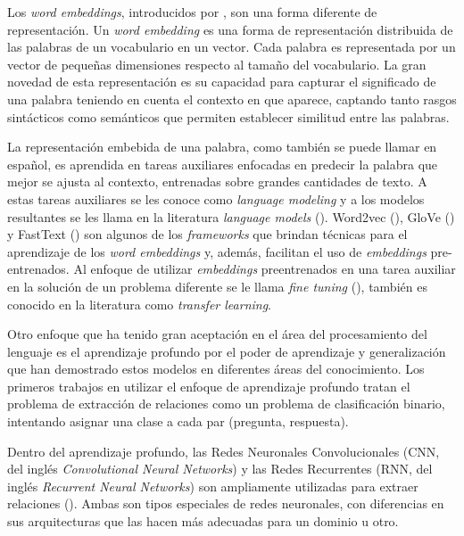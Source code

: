 Los \textit{word embeddings}, introducidos por \cite{mikolov-2013-word2vec}, son una forma diferente de representación. Un \textit{word embedding} es una forma de representación distribuida de las palabras de un vocabulario en un vector. Cada palabra es representada por un vector de pequeñas dimensiones respecto al tamaño del vocabulario. La gran novedad de esta representación es su capacidad para capturar el significado de una palabra teniendo en cuenta el contexto en que aparece, captando tanto rasgos sintácticos como semánticos que permiten establecer similitud entre las palabras.

La representación embebida de una palabra, como también se puede llamar en español, es aprendida en tareas auxiliares enfocadas en predecir la palabra que mejor se ajusta al contexto, entrenadas sobre grandes cantidades de texto. A estas tareas auxiliares se les conoce como \textit{language modeling} y a los modelos resultantes se les llama en la literatura \textit{language models} (\cite{rao-2019-nlpPython}). Word2vec (\cite{mikolov-2013-word2vec}), GloVe (\cite{pennington-2014-glove}) y FastText (\cite{mikolov-2016-fastext}) son algunos de los \textit{frameworks} que brindan técnicas para el aprendizaje de los \textit{word embeddings} y, además, facilitan el uso de \textit{embeddings} pre-entrenados. Al enfoque de utilizar \textit{embeddings} preentrenados en una tarea auxiliar en la solución de un problema diferente se le llama \textit{fine tuning} (\cite{rao-2019-nlpPython}), también es conocido en la literatura como \textit{transfer learning}.

Otro enfoque que ha tenido gran aceptación en el área del procesamiento del lenguaje es el aprendizaje profundo por el poder de aprendizaje y generalización que han demostrado estos modelos en diferentes áreas del conocimiento. Los primeros trabajos en utilizar el enfoque de aprendizaje profundo tratan el problema de extracción de relaciones como un problema de clasificación binario, intentando asignar una clase a cada par (pregunta, respuesta).

Dentro del aprendizaje profundo, las Redes Neuronales Convolucionales (CNN, del inglés \textit{Convolutional Neural Networks}) y las Redes Recurrentes (RNN, del inglés \textit{Recurrent Neural Networks}) son ampliamente utilizadas para extraer relaciones (\cite{kumar-2017-surveydeeplearning}). Ambas son tipos especiales de redes neuronales, con diferencias en sus arquitecturas que las hacen más adecuadas para un dominio u otro.


